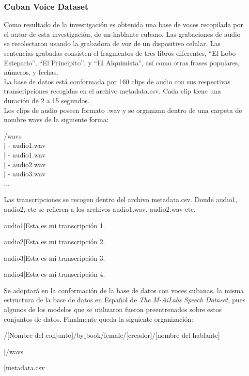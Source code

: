 \subsubsection{Cuban Voice Dataset}
Como resultado de la investigación es obtenida una base de voces recopilada por el autor de esta investigación, de un hablante cubano. Las grabaciones de audio se recolectaron usando la grabadora de voz de un dispositivo celular. Las sentencias grabadas consisten el fragmentos de tres libros diferentes, ``El Lobo Estepario'',  ``El Principito'', y  ``El Alquimista'', así como otras frases populares, números, y fechas.\\ 

La base de datos está conformada por 160 clips de audio con sus respectivas transcripciones recogidas en el archivo metadata.csv. Cada clip tiene una duración de 2 a 15 segundos.\\

Los clips de audio poseen formato .wav y se organizan dentro de una carpeta de nombre wavs de la siguiente forma:

\begin{center}
	/wavs\\
	| - audio1.wav\\
	| - audio1.wav\\
	| - audio2.wav\\
	| - audio3.wav\\
	...
\end{center}

Las transcripciones se recogen dentro del archivo metadata.csv. Donde audio1, audio2, etc se refieren a los archivos audio1.wav, audio2.wav etc.

\begin{center}
	audio1|Esta es mi transcripción 1.
	
	audio2|Esta es mi transcripción 2.
	
	audio3|Esta es mi transcripción 3.
	
	audio4|Esta es mi transcripción 4.
\end{center}

Se adoptará en la conformación de la base de datos con voces cubanas, la misma estructura de la base de datos en Español de \textit{The M-AiLabs Speech Dataset}, pues algunos de los modelos que se utilizaron fueron preentrenados sobre estos conjuntos de datos. Finalmente queda la siguiente organización:

\begin{flushleft}
	/[Nombre del conjunto]/by$\_$book/female/[creador]/[nombre del hablante]
	
	|/wavs
	
	|metadata.csv
\end{flushleft}

